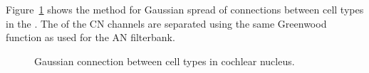 
Figure~\ref{fig:CNconn} shows the method for Gaussian spread of connections between cell types in the \CN.
The \CF of the CN channels are separated using the same Greenwood function as used for the AN filterbank.








\begin{figure}[htb]
  \begin{center}
    \caption{Gaussian connection between cell types in cochlear nucleus.}
    \label{fig:CNconn}
  \end{center}
\end{figure}


